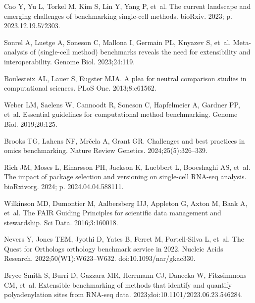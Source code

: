 \documentclass[11pt]{article}
\begin{document}
\pagebreak
\linespread{1} 




\begin{thebibliography}{10}

Cao Y, Yu L, Torkel M, Kim S, Lin Y, Yang P, et~al.
\newblock The current landscape and emerging challenges of benchmarking
  single-cell methods.
\newblock bioRxiv. 2023; p. 2023.12.19.572303.

Sonrel A, Luetge A, Soneson C, Mallona I, Germain PL, Knyazev S, et~al.
\newblock Meta-analysis of (single-cell method) benchmarks reveals the need for
  extensibility and interoperability.
\newblock Genome Biol. 2023;24:119.

Boulesteix AL, Lauer S, Eugster MJA.
\newblock A plea for neutral comparison studies in computational sciences.
\newblock PLoS One. 2013;8:e61562.

Weber LM, Saelens W, Cannoodt R, Soneson C, Hapfelmeier A, Gardner PP, et~al.
\newblock Essential guidelines for computational method benchmarking.
\newblock Genome Biol. 2019;20:125.

Brooks TG, Lahens NF, Mrčela A, Grant GR.
\newblock Challenges and best practices in omics benchmarking.
\newblock Nature Review Genetics. 2024;25(5):326--339.

Rich JM, Moses L, Einarsson PH, Jackson K, Luebbert L, Booeshaghi AS, et~al.
\newblock The impact of package selection and versioning on single-cell
  {RNA}-seq analysis.
\newblock bioRxivorg. 2024; p. 2024.04.04.588111.

Wilkinson MD, Dumontier M, Aalbersberg IJJ, Appleton G, Axton M, Baak A, et~al.
\newblock The {FAIR} Guiding Principles for scientific data management and
  stewardship.
\newblock Sci Data. 2016;3:160018.

Nevers Y, Jones TEM, Jyothi D, Yates B, Ferret M, Portell-Silva L, et~al.
\newblock The Quest for Orthologs orthology benchmark service in 2022.
\newblock Nucleic Acids Research. 2022;50(W1):W623–W632.
\newblock doi:{10.1093/nar/gkac330}.

Bryce-Smith S, Burri D, Gazzara MR, Herrmann CJ, Danecka W, Fitzsimmons CM,
  et~al.
\newblock Extensible benchmarking of methods that identify and quantify
  polyadenylation sites from RNA-seq data.
  2023;doi:{10.1101/2023.06.23.546284}.


\end{thebibliography}
\end{document}
